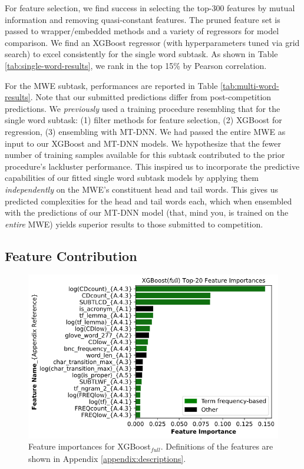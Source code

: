 \documentclass[11pt,a4paper]{article}
\begin{document}
\label{sec:performance}

For feature selection, we find success in selecting the top-300 features by mutual information and removing quasi-constant features. The pruned feature set is passed to wrapper/embedded methods and a variety of regressors for model comparison. We find an XGBoost regressor (with hyperparameters tuned via grid search) to excel consistently for the single word subtask. As shown in Table \ref{tab:single-word-results}, we rank in the top 15\% by Pearson correlation.

For the MWE subtask, performances are reported in Table \ref{tab:multi-word-results}. Note that our submitted predictions differ from post-competition predictions. We \textit{previously} used a training procedure resembling that for the single word subtask: (1) filter methods for feature selection, (2) XGBoost for regression, (3) ensembling with MT-DNN. We had passed the entire MWE as input to our XGBoost and MT-DNN models. We hypothesize that the fewer number of training samples available for this subtask contributed to the prior procedure's lackluster performance. This inspired us to incorporate the predictive capabilities of our fitted single word subtask models by applying them \textit{independently} on the MWE's constituent head and tail words. This gives us predicted complexities for the head and tail words each, which when ensembled with the predictions of our MT-DNN model (that, mind you, is trained on the \textit{entire} MWE) yields superior results to those submitted to competition.

\subsection{Feature Contribution}

\begin{figure}
  \centering
  \includegraphics[scale=0.3]{xgboost_feature_importances.png}
  \captionsetup{justification=centering}
  \caption{\label{fig:xgboost_feature_importance} Feature importances for XGBoost$_\textit{full}$. Definitions of the features are shown in Appendix \ref{appendix:descriptions}.}
\end{figure}
\end{document}
